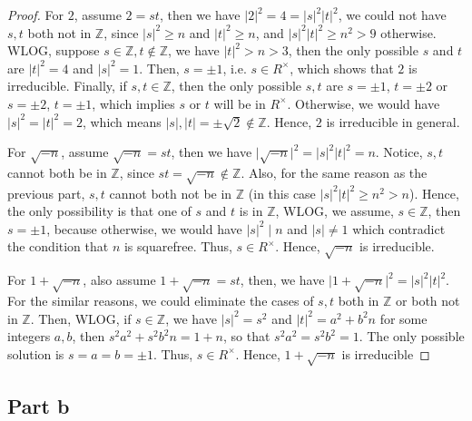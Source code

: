 \begin{answer}
    \begin{proof}
        For $2$, assume $2 = st$, then we have $\lvert 2 \rvert^2 = 4 = \lvert s \rvert^2 \lvert t \rvert^2$, we could not have $s,t$ both not in $\mathbb{Z}$, since $\lvert s \rvert^2 \geq n$ and $\lvert t \rvert^2 \geq n$, and $\lvert s \rvert^2 \lvert t \rvert^2 \geq n^2 > 9$ otherwise. WLOG, suppose $s \in \mathbb{Z}, t \notin \mathbb{Z}$, we have $\lvert t \rvert^2 > n > 3$, then the only possible $s$ and $t$ are $\lvert t \rvert^2 = 4$ and $\lvert s \rvert^2 = 1$. Then, $s = \pm 1$, i.e. $s \in R^{\times}$, which shows that $2$ is irreducible. Finally, if $s,t \in \mathbb{Z}$, then the only possible $s,t$ are $s = \pm 1$, $t = \pm 2$ or $s = \pm 2$, $t = \pm 1$, which implies $s$ or $t$ will be in $R^{\times}$. Otherwise, we would have $\lvert s \rvert^2 = \lvert t \rvert^2 = 2$, which means $\lvert s \rvert, \lvert t \rvert = \pm \sqrt{2} \notin \mathbb{Z}$. Hence, $2$ is irreducible in general.
        
        For $\sqrt{-n}$, assume $\sqrt{-n} = st$, then we have $\lvert \sqrt{-n} \rvert^2 = \lvert s \rvert^2 \lvert t \rvert^2 = n$. Notice, $s,t$ cannot both be in $\mathbb{Z}$, since $st = \sqrt{-n} \notin \mathbb{Z}$. Also, for the same reason as the previous part, $s,t$ cannot both not be in $\mathbb{Z}$ (in this case $\lvert s \rvert^2 \lvert t \rvert^2 \geq n^2 > n$). Hence, the only possibility is that one of $s$ and $t$ is in $\mathbb{Z}$, WLOG, we assume, $s \in \mathbb{Z}$, then $s = \pm 1$, because otherwise, we would have $\lvert s \rvert^2 \mid n$ and $\lvert s \rvert \neq 1$ which contradict the condition that $n$ is squarefree. Thus, $s \in R^{\times}$. Hence, $\sqrt{-n}$ is irreducible.
        
        For $1+\sqrt{-n}$, also assume $1+\sqrt{-n} = st$, then, we have $\lvert 1 + \sqrt{-n} \lvert^2 = \lvert s \rvert^2 \lvert t \rvert^2$. For the similar reasons, we could eliminate the cases of $s,t$ both in $\mathbb{Z}$ or both not in $\mathbb{Z}$. Then, WLOG, if $s \in \mathbb{Z}$, we have $\lvert s \rvert^2 = s^2$ and $\lvert t \rvert^2 = a^2 + b^2n$ for some integers $a,b$, then $s^2a^2 + s^2b^2n = 1 + n$, so that $s^2a^2 = s^2b^2 = 1$. The only possible solution is $s = a = b = \pm 1$. Thus, $s \in R^{\times}$. Hence, $1 + \sqrt{-n}$ is irreducible
    \end{proof}
\end{answer}

\subsection{Part b}

